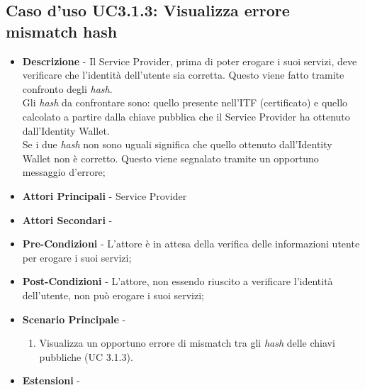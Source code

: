\subsection{Caso d'uso UC3.1.3: Visualizza errore mismatch hash}
\begin{itemize}
	\item \textbf{Descrizione} - Il Service Provider, prima di poter erogare i suoi servizi, deve verificare che l'identità dell'utente sia corretta. Questo viene fatto tramite confronto degli \textit{hash}.\\
	Gli \textit{hash} da confrontare sono: quello presente nell'\gls{ITF} (certificato) e quello calcolato a partire dalla chiave pubblica che il Service Provider ha ottenuto dall'Identity Wallet.\\
	Se i due \textit{hash} non sono uguali significa che quello ottenuto dall'Identity Wallet non è corretto. Questo viene segnalato tramite un opportuno messaggio d'errore;
	\item \textbf{Attori Principali} - Service Provider
	\item \textbf{Attori Secondari} -
	\item \textbf{Pre-Condizioni} - L'attore è in attesa della verifica delle informazioni utente per erogare i suoi servizi;
	\item \textbf{Post-Condizioni} - L'attore, non essendo riuscito a verificare l'identità dell'utente, non può erogare i suoi servizi;
	\item \textbf{Scenario Principale} - 
	\begin{enumerate}
		\item Visualizza un opportuno errore di mismatch tra gli \textit{hash} delle chiavi pubbliche (UC 3.1.3).
	\end{enumerate}
	\item \textbf{Estensioni} -
\end{itemize}
